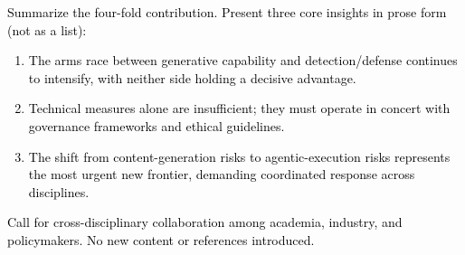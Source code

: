 \documentclass[preprint,12pt]{elsarticle}
\newcommand{\outline}[1]{\textcolor{black}{#1}}
\begin{document}
\outline{%
Summarize the four-fold contribution. Present three core insights in prose form (not as a list):
\begin{enumerate}[nosep,leftmargin=1.5em]
    \item The arms race between generative capability and detection/defense continues to intensify, with neither side holding a decisive advantage.
    \item Technical measures alone are insufficient; they must operate in concert with governance frameworks and ethical guidelines.
    \item The shift from content-generation risks to agentic-execution risks represents the most urgent new frontier, demanding coordinated response across disciplines.
\end{enumerate}
Call for cross-disciplinary collaboration among academia, industry, and policymakers. No new content or references introduced.
}





\begin{thebibliography}

\end{thebibliography}
\end{document}
